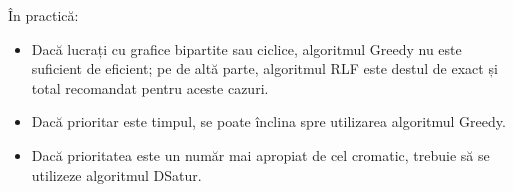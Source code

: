 \documentclass[runningheads]{paper}
\begin{document}
În practică:
\begin{itemize}
    \item Dacă lucrați cu grafice bipartite sau ciclice, algoritmul Greedy nu este
    suficient de eficient; pe de altă parte, algoritmul RLF este destul de exact și total
    recomandat pentru aceste cazuri.
    \item Dacă prioritar este timpul, se poate înclina spre utilizarea algoritmul Greedy.
    \item Dacă prioritatea este un număr mai apropiat de cel cromatic, trebuie
    să se utilizeze algoritmul DSatur.

\end{itemize}
\pagebreak

%
%
%
% 
% 
%
\end{document}
